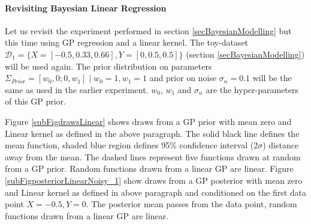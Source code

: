 \begin{mdframed}[hidealllines=true,backgroundcolor=lightgray!20]
\paragraph{Revisiting Bayesian Linear Regression}\label{paraLinearGPExperiment}
Let us revisit the experiment performed in section \ref{secBayesianModelling} but this time using GP regression and a linear kernel. The toy-dataset $\mathcal{D}_{1} = \{X = [-0.5, 0.33, 0.66], Y = [0, 0.5, 0.5]\}$ (section \ref{secBayesianModelling}) will be used again. The prior distribution on parameters $\Sigma_{Prior} = [w_{0}, 0; 0, w_{1}] \mid w_{0} = 1, w_{1} = 1$ and prior on noise $\sigma_{n} = 0.1$ will be the same as used in the earlier experiment. $w_{0}$, $w_{1}$ and $\sigma_{n}$ are the hyper-parameters of this GP prior. 

Figure \ref{subFigdrawsLinear} shows draws from a GP prior with mean zero and Linear kernel as defined in the above paragraph. The solid black line defines the mean function, shaded blue region defines 95\% confidence interval (2$\sigma$) distance away from the mean. The dashed lines represent five functions drawn at random from a GP prior. Random functions drawn from a linear GP are linear. Figure \ref{subFigposteriorLinearNoisy_1} show draws from a GP posterior with mean zero and Linear kernel  as defined in above paragraph and conditioned on the first data point $X = -0.5, Y = 0$. The posterior mean passes from the data point, random functions drawn from a linear GP are linear.
\end{mdframed}

